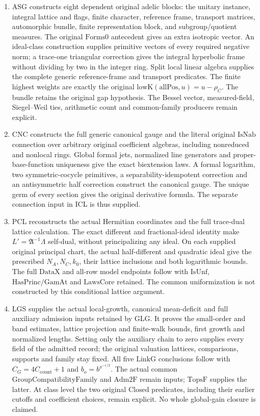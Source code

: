 \documentclass[11pt,a4paper]{article}
\numberwithin{equation}{section}
\theoremstyle{remark}\newtheorem{remark}[theorem]{Remark}
\begin{document}
\begin{enumerate}
\item ASG constructs eight dependent original adelic blocks:
the unitary instance, integral lattice and flags, finite character,
reference frame, transport matrices, automorphic bundle, finite
representation block, and subgroup/quotient measures.
The original \(\mathrm{Forms0}\) antecedent gives an extra
isotropic vector. An ideal-class construction supplies primitive
vectors of every required negative norm; a trace-one triangular
correction gives the integral hyperbolic frame without dividing by two
in the integer ring. Split local linear algebra supplies the complete
generic reference-frame and transport predicates.
The finite highest weights are exactly the original
\(\mathrm{lowK}(\mathrm{allPos},u)=u-\rho_C\).
The bundle retains the original gap hypothesis. The Bessel vector,
measured-field, Siegel--Weil ties, arithmetic count and common-family
producers remain explicit.

\item CNC constructs the full generic canonical gauge and the literal
original \(\mathrm{IsNab}\) connection over arbitrary original
coefficient algebras, including nonreduced and nonlocal rings.
Global formal jets, normalized line generators and proper-base-function
uniqueness give the exact biextension laws. A formal logarithm,
two symmetric-cocycle primitives, a separability-idempotent correction
and an antisymmetric half correction construct the canonical gauge.
The unique germ of every section gives the original derivative formula.
The separate connection input in ICL is thus supplied.

\item PCL reconstructs the actual Hermitian coordinates and the full
trace-dual lattice calculation. The exact different and fractional-ideal
identity make \(L'=\mathfrak A^{-1}\Lambda\) self-dual, without
principalizing any ideal. On each supplied original principal chart,
the actual half-different and quadratic ideal give the prescribed
\(N_A,N_C,k_0\), their lattice inclusions and both logarithmic bounds.
The full \(\mathrm{DataX}\) and all-row model endpoints follow with
\(\mathrm{IsUnf}\), \(\mathrm{HasPrinc}/\mathrm{GamAt}\) and
\(\mathrm{LawsCore}\) retained. The common uniformization is not
constructed by this conditional lattice argument.

\item LGS supplies the actual local-growth, canonical mean-deficit
and full auxiliary admission inputs retained by GLG. It proves the
small-order and band estimates, lattice projection and finite-walk
bounds, first growth and normalized lengths. Setting only the
auxiliary chain to zero supplies every field of the admitted record;
the original valuation lattices, comparisons, supports and family
stay fixed. All five \(\mathrm{LinkG}\) conclusions follow with
\(C_G=4C_{\mathrm{count}}+1\) and
\(b_o=b^{x^{-\epsilon/2}}\).
The actual common \(\mathrm{GroupCompatibilityFamily}\) and
\(\mathrm{Adm2F}\) remain inputs; \(\mathrm{TopsF}\) supplies
the latter. At class level the two original \(\mathrm{Closed}\)
predicates, including their earlier cutoffs and coefficient choices,
remain explicit. No whole global-gain closure is claimed.
\end{enumerate}
\end{document}
